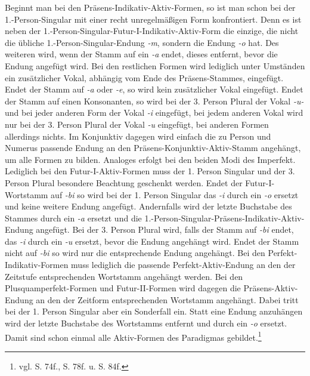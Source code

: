 Beginnt man bei den Präsens-Indikativ-Aktiv-Formen, so ist man schon bei der 1.-Person-Singular mit einer recht unregelmäßigen Form konfrontiert. Denn es ist neben der 1.-Person-Singular-Futur-I-Indikativ-Aktiv-Form die einzige, die nicht die übliche 1.-Person-Singular-Endung \textit{-m}, sondern die Endung \textit{-o} hat. Des weiteren wird, wenn der Stamm auf ein \textit{-a} endet, dieses entfernt, bevor die Endung angefügt wird. Bei den restlichen Formen wird lediglich unter Umständen ein zusätzlicher Vokal, abhängig vom Ende des Präsens-Stammes, eingefügt. Endet der Stamm auf \textit{-a} oder \textit{-e}, so wird kein zusätzlicher Vokal eingefügt. Endet der Stamm auf einen Konsonanten, so wird bei der 3. Person Plural der Vokal \textit{-u-} und bei jeder anderen Form der Vokal \textit{-i} eingefügt, bei jedem anderen Vokal wird nur bei der 3. Person Plural der Vokal \textit{-u} eingefügt, bei anderen Formen allerdings nichts. Im Konjunktiv dagegen wird einfach die zu Person und Numerus passende Endung an den Präsens-Konjunktiv-Aktiv-Stamm angehängt, um alle Formen zu bilden. Analoges erfolgt bei den beiden Modi des Imperfekt. Lediglich bei den Futur-I-Aktiv-Formen muss der 1. Person Singular und der 3. Person Plural besondere Beachtung geschenkt werden. Endet der Futur-I-Wortstamm auf \textit{-bi} so wird bei der 1. Person Singular das \textit{-i} durch ein \textit{-o} ersetzt und keine weitere Endung angefügt. Andernfalls wird der letzte Buchstabe des Stammes durch ein \textit{-a} ersetzt und die 1.-Person-Singular-Präsens-Indikativ-Aktiv-Endung angefügt. Bei der 3. Person Plural wird, falls der Stamm auf \textit{-bi} endet, das \textit{-i} durch ein \textit{-u} ersetzt, bevor die Endung angehängt wird. Endet der Stamm nicht auf \textit{-bi} so wird nur die entsprechende Endung angehängt. Bei den Perfekt-Indikativ-Formen muss lediglich die passende Perfekt-Aktiv-Endung an den der Zeitstufe entsprechenden Wortstamm angehängt werden. Bei den Plusquamperfekt-Formen und Futur-II-Formen wird dagegen die Präsens-Aktiv-Endung an den der Zeitform entsprechenden Wortstamm angehängt. Dabei tritt bei der 1. Person Singular aber ein Sonderfall ein. Statt eine Endung anzuhängen wird der letzte Buchstabe des Wortstamms entfernt und durch ein \textit{-o} ersetzt. Damit sind schon einmal alle Aktiv-Formen des Paradigmas gebildet.\footnote{vgl. \cite{BAYER-LINDAUER1994} S. 74f., S. 78f. u. S. 84f.} \par

